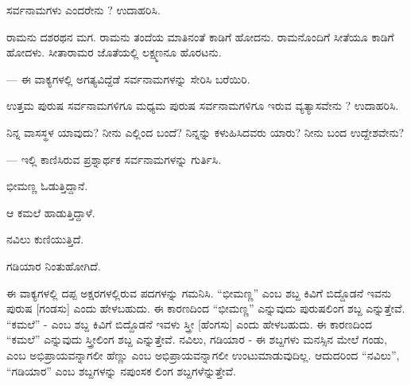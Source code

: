 \vspace{2.5pt plus 3pt minus 0.5pt}\noindent\hspace*{1.2em}\hspace{0.55em}ಸರ್ವನಾಮಗಳು ಎಂದರೇನು ? ಉದಾಹರಿಸಿ.\par

\vspace{2.5pt plus 3pt minus 0.5pt}\noindent\hspace*{1.2em}\hspace{0.55em}ರಾಮನು ದಶರಥನ ಮಗ. ರಾಮನು ತಂದೆಯ ಮಾತಿನಂತೆ ಕಾಡಿಗೆ ಹೋದನು. ರಾಮನೊಂದಿಗೆ ಸೀತೆಯೂ ಕಾಡಿಗೆ ಹೋದಳು. ಸೀತಾರಾಮರ ಜೊತೆಯಲ್ಲಿ ಲಕ್ಷ್ಮಣನೂ ಹೊರಟನು.\par

\indent — ಈ ವಾಕ್ಯಗಳಲ್ಲಿ ಅಗತ್ಯವಿದ್ದೆಡೆ ಸರ್ವನಾಮಗಳನ್ನು ಸೇರಿಸಿ ಬರೆಯಿರಿ.\par

\vspace{2.5pt plus 3pt minus 0.5pt}\noindent\hspace*{1.2em}\hspace{0.55em}ಉತ್ತಮ ಪುರುಷ ಸರ್ವನಾಮಗಳಿಗೂ ಮಧ್ಯಮ ಪುರುಷ ಸರ್ವನಾಮಗಳಿಗೂ ಇರುವ ವ್ಯತ್ಯಾಸವೇನು ? ಉದಾಹರಿಸಿ.\par

\vspace{2.5pt plus 3pt minus 0.5pt}\noindent\hspace*{1.2em}\hspace{0.55em}ನಿನ್ನ ವಾಸಸ್ಥಳ ಯಾವುದು? ನೀನು ಎಲ್ಲಿಂದ ಬಂದೆ? ನಿನ್ನನ್ನು ಕಳುಹಿಸಿದವರು ಯಾರು? ನೀನು ಬಂದ ಉದ್ದೇಶವೇನು?\par

\indent — ಇಲ್ಲಿ ಕಾಣಿಸಿರುವ ಪ್ರಶ್ನಾರ್ಥಕ ಸರ್ವನಾಮಗಳನ್ನು ಗುರ್ತಿಸಿ.\par



\noindent\hspace*{2.2em}ಭೀಮಣ್ಣ ಓಡುತ್ತಿದ್ದಾನೆ.\par

\noindent\hspace*{2.2em}ಆ ಕಮಲೆ ಹಾಡುತ್ತಿದ್ದಾಳೆ.\par

\noindent\hspace*{2.2em}ನವಿಲು ಕುಣಿಯುತ್ತಿದೆ.\par

\noindent\hspace*{2.2em}ಗಡಿಯಾರ ನಿಂತುಹೋಗಿದೆ.\par

\indent ಈ ವಾಕ್ಯಗಳಲ್ಲಿ ದಪ್ಪ ಅಕ್ಷರಗಳಲ್ಲಿರುವ ಪದಗಳನ್ನು ಗಮನಿಸಿ. “ಭೀಮಣ್ಣ” ಎಂಬ ಶಬ್ದ ಕಿವಿಗೆ ಬಿದ್ದೊಡನೆ ಇವನು ಪುರುಷ {[}ಗಂಡಸು{]} ಎಂದು ಹೇಳಬಹುದು. ಈ ಕಾರಣದಿಂದ “ಭೀಮಣ್ಣ” ಎನ್ನುವುದು ಪುರುಷಲಿಂಗ ಶಬ್ದ ಎನ್ನುತ್ತೇವೆ. “ಕಮಲೆ” - ಎಂಬ ಶಬ್ದ ಕಿವಿಗೆ ಬಿದ್ದೊಡನೆ ಇವಳು ಸ್ತ್ರೀ {[}ಹೆಂಗಸು{]} ಎಂದು ಹೇಳಬಹುದು. ಈ ಕಾರಣದಿಂದ “ಕಮಲೆ” ಎನ್ನುವುದು ಸ್ತ್ರೀಲಿಂಗ ಶಬ್ದ ಎನ್ನುತ್ತೇವೆ. ನವಿಲು, ಗಡಿಯಾರ - ಈ ಶಬ್ದಗಳು ಮನಸ್ಸಿನ ಮೇಲೆ ಗಂಡು, ಎಂಬ ಅಭಿಪ್ರಾಯವನ್ನಾಗಲೀ ಹೆಣ್ಣು ಎಂಬ ಅಭಿಪ್ರಾಯವನ್ನಾಗಲೀ ಉಂಟುಮಾಡುವುದಿಲ್ಲ. ಆದುದರಿಂದ “ನವಿಲು”, “ಗಡಿಯಾರ” ಎಂಬ ಶಬ್ದಗಳನ್ನು ನಪುಂಸಕ ಲಿಂಗ ಶಬ್ದಗಳೆನ್ನುತ್ತೇವೆ.\par
